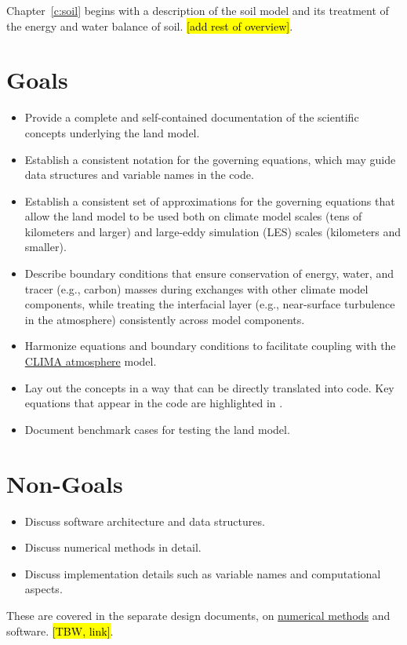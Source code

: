 \documentclass[twoside,10pt]{report}
\begin{document}
Chapter~\ref{c:soil} begins with a description of the soil model and its treatment of the energy and water balance of soil. \hl{[add rest of overview]}.

\section{Goals}

\begin{itemize}
    \item Provide a complete and self-contained documentation of the scientific concepts underlying the land model.
    \item Establish a consistent notation for the governing equations, which may guide data structures and variable names in the code.
    \item Establish a consistent set of approximations for the governing equations that allow the land model to be used both on climate model scales (tens of kilometers and larger) and large-eddy simulation (LES) scales (kilometers and smaller).
    \item Describe boundary conditions that ensure conservation of energy, water, and tracer (e.g., carbon) masses during exchanges with other climate model components, while treating the interfacial layer (e.g., near-surface turbulence in the atmosphere) consistently across model components.
    \item Harmonize equations and boundary conditions to facilitate coupling with the \href{https://github.com/climate-machine/Design-Docs/blob/master/CLIMA-atmos/}{CLIMA atmosphere} model.
    \item Lay out the concepts in a way that can be directly translated into code. Key equations that appear in the code are highlighted in .
    \item Document benchmark cases for testing the land model.
\end{itemize}

\section{Non-Goals}

\begin{itemize}
    \item Discuss software architecture and data structures.
    \item Discuss numerical methods in detail.
    \item Discuss implementation details such as variable names and computational aspects.
\end{itemize}
These are covered in the separate design documents, on \href{https://github.com/climate-machine/Design-Docs/tree/master/CLIMA-numerics}{numerical methods} and software. \hl{[TBW, link]}.
\end{document}

